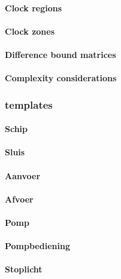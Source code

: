 \paragraph{Clock regions}
\paragraph{Clock zones}
\paragraph{Difference bound matrices}
\paragraph{Complexity considerations}



\subsubsection{templates}

\paragraph{Schip}

\paragraph{Sluis}


\paragraph{Aanvoer}


\paragraph{Afvoer}

\paragraph{Pomp}

\paragraph{Pompbediening}


\paragraph{Stoplicht}

